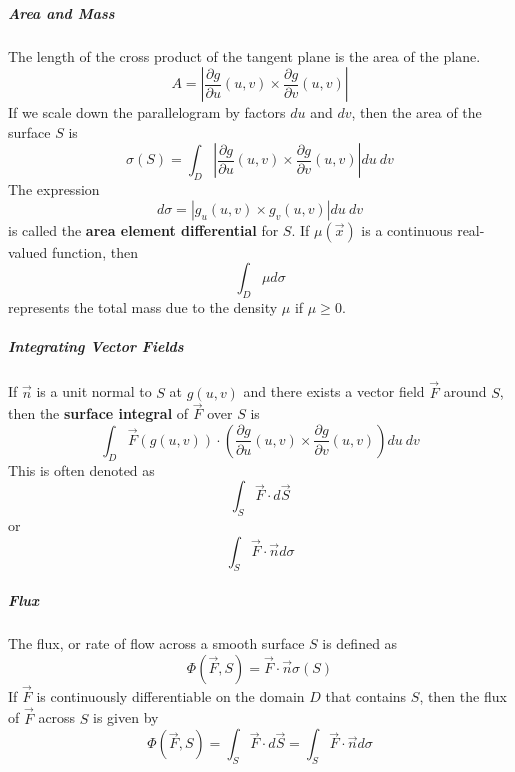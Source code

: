 \documentclass[11pt]{article}
\begin{document}
	\subparagraph{Area and Mass} The length of the cross product of the tangent plane is the area of the plane.
		\begin{equation}
			A = \left| \frac{\partial g}{\partial u}(u, v) \times \frac{\partial g}{\partial v}(u, v) \right|
		\end{equation}
		If we scale down the parallelogram by factors $du$ and $dv$, then the area of the surface $S$ is
		\begin{equation}
			\sigma (S) = \int_D \left| \frac{\partial g}{\partial u}(u, v) \times \frac{\partial g}{\partial v}(u, v) \right| du\ dv
		\end{equation}
		The expression
		\begin{equation}
			d\sigma = |g_u (u, v) \times g_v (u, v)| du\ dv
		\end{equation}
		is called the \textbf{area element differential} for $S$. If $\mu (\vec{x})$ is a continuous real-valued function, then
		\begin{equation}
			\int_D \mu d\sigma
		\end{equation}
		represents the total mass due to the density $\mu$ if $\mu \geq 0$.
		
	\subparagraph{Integrating Vector Fields} If $\vec{n}$ is a unit normal to $S$ at $g(u, v)$ and there exists a vector field $\vec{F}$ around $S$, then the \textbf{surface integral} of $\vec{F}$ over $S$ is
		\begin{equation}
			\int_D \vec{F}(g(u, v)) \cdot \left( \frac{\partial g}{\partial u}(u, v) \times \frac{\partial g}{\partial v}(u, v) \right) du\ dv
		\end{equation}
		This is often denoted as \[\int_S \vec{F} \cdot d\vec{S}\] or \[\int_S \vec{F} \cdot \vec{n} d\sigma\]
		
	\subparagraph{Flux} The flux, or rate of flow across a smooth surface $S$ is defined as
		\begin{equation}
			\Phi (\vec{F}, S) = \vec{F} \cdot \vec{n} \sigma(S)
		\end{equation}
		If $\vec{F}$ is continuously differentiable on the domain $D$ that contains $S$, then the flux of $\vec{F}$ across $S$ is given by
		\begin{equation}
			\Phi (\vec{F}, S) = \int_S \vec{F} \cdot d\vec{S} = \int_S \vec{F} \cdot \vec{n} d\sigma
		\end{equation}
		
\end{document}
